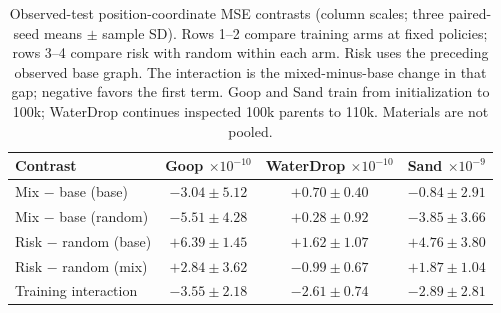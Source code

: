 \begin{table}[t]
\centering\scriptsize
\caption{Observed-test position-coordinate MSE contrasts (column scales; three paired-seed means $\pm$ sample SD). Rows 1--2 compare training arms at fixed policies; rows 3--4 compare risk with random within each arm. Risk uses the preceding observed base graph. The interaction is the mixed-minus-base change in that gap; negative favors the first term. Goop and Sand train from initialization to 100k; WaterDrop continues inspected 100k parents to 110k. Materials are not pooled.}
\label{tab:goop-exposure-placement}
\setlength{\tabcolsep}{2pt}
\begin{tabular}{lccc}
\toprule
Contrast & \shortstack{Goop\\$\times10^{-10}$} & \shortstack{WaterDrop\\$\times10^{-10}$} & \shortstack{Sand\\$\times10^{-9}$}\\
\midrule
Mix $-$ base (base) & $-3.04\pm5.12$ & $+0.70\pm0.40$ & $-0.84\pm2.91$\\
Mix $-$ base (random) & $-5.51\pm4.28$ & $+0.28\pm0.92$ & $-3.85\pm3.66$\\
Risk $-$ random (base) & $+6.39\pm1.45$ & $+1.62\pm1.07$ & $+4.76\pm3.80$\\
Risk $-$ random (mix) & $+2.84\pm3.62$ & $-0.99\pm0.67$ & $+1.87\pm1.04$\\
Training interaction & $-3.55\pm2.18$ & $-2.61\pm0.74$ & $-2.89\pm2.81$\\
\bottomrule
\end{tabular}
\end{table}
